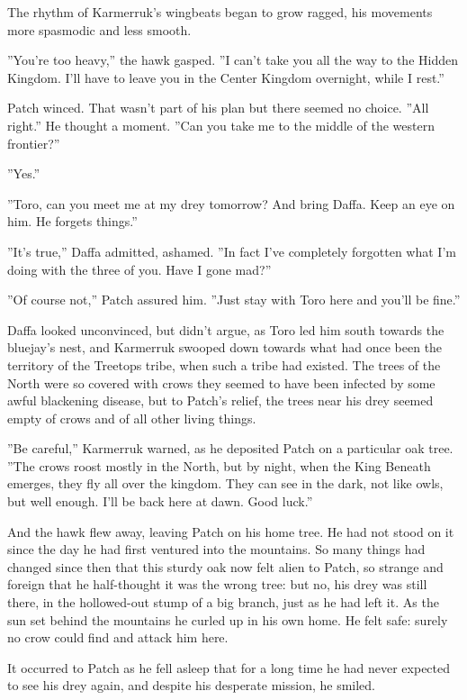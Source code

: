 \documentclass[11pt]{article}
\begin{document}
The rhythm of Karmerruk's wingbeats began to grow ragged, his movements more spasmodic and less smooth.\par
 ''You're too heavy,'' the hawk gasped. ''I can't take you all the way to the Hidden Kingdom. I'll have to leave you in the Center Kingdom overnight, while I rest.''\par
 Patch winced. That wasn't part of his plan %
 but there seemed no choice. ''All right.'' He thought a moment. ''Can you take me to the middle of the western frontier?''\par
 ''Yes.''\par
 ''Toro, can you meet me at my drey tomorrow? And bring Daffa. Keep an eye on him. He forgets things.''\par
 ''It's true,'' Daffa admitted, ashamed. ''In fact I've completely forgotten what I'm doing with the three of you. Have I gone mad?''\par
 ''Of course not,'' Patch assured him. ''Just stay with Toro here and you'll be fine.''\par
 Daffa looked unconvinced, but didn't argue, as Toro led him south towards the bluejay's nest, and Karmerruk swooped down towards what had once been the territory of the Treetops tribe, when such a tribe had existed. The trees of the North were so covered with crows they seemed to have been infected by some awful blackening disease, but to Patch's relief, the trees near his drey seemed empty of crows %
 and of all other living things.\par
 ''Be careful,'' Karmerruk warned, as he deposited Patch on a particular oak tree. ''The crows roost mostly in the North, but by night, when the King Beneath emerges, they fly all over the kingdom. They can see in the dark, not like owls, but well enough. I'll be back here at dawn. Good luck.''\par
 And the hawk flew away, leaving Patch on his home tree. He had not stood on it since the day he had first ventured into the mountains. So many things had changed since then that this sturdy oak now felt alien to Patch, so strange and foreign that he half-thought it was the wrong tree: but no, his drey was still there, in the hollowed-out stump of a big branch, just as he had left it. As the sun set behind the mountains he curled up in his own home. He felt safe: surely no crow could find and attack him here.\par
It occurred to Patch as he fell asleep that for a long time he had never expected to see his drey again, and despite his desperate mission, he smiled.\par
\end{document}
